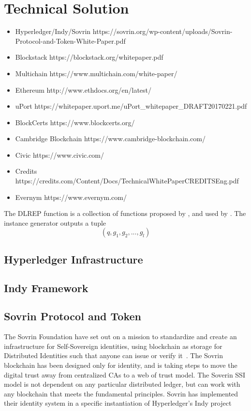 \chapter{Technical Solution}
\label{chap:solution}



\begin{itemize}
    \item Hyperledger/Indy/Sovrin https://sovrin.org/wp-content/uploads/Sovrin-Protocol-and-Token-White-Paper.pdf
    \item Blockstack https://blockstack.org/whitepaper.pdf
    \item Multichain https://www.multichain.com/white-paper/
    \item Ethereum http://www.ethdocs.org/en/latest/
    \item uPort https://whitepaper.uport.me/uPort\_whitepaper\_DRAFT20170221.pdf
    \item BlockCerts https://www.blockcerts.org/
    \item Cambridge Blockchain https://www.cambridge-blockchain.com/
    \item Civic https://www.civic.com/
    \item Credits https://credits.com/Content/Docs/TechnicalWhitePaperCREDITSEng.pdf
    \item Evernym  https://www.evernym.com/
\end{itemize}

The DLREP function is a collection of functions proposed by \cite{Brands2000}, and used by \cite{Augot2017}. The instance generator outputs a tuple \[(q, g_1, g_2,...,g_l)\]

\section{Hyperledger Infrastructure}

\section{Indy Framework}

\section{Sovrin Protocol and Token}
The Sovrin Foundation have set out on a mission to standardize and create an infrastructure for Self-Sovereign identities, using blockchain as storage for Distributed Identities such that anyone can issue or verify it~\cite{sovrin}. The Sovrin blockchain has been designed only for identity, and is taking steps to move the digital trust away from centralized CAs to a web of trust model. The Soverin SSI model is not dependent on any particular distributed ledger, but can work with any blockchain that meets the fundamental principles. Sovrin has implemented their identity system in a specific instantiation of Hyperledger's Indy project
